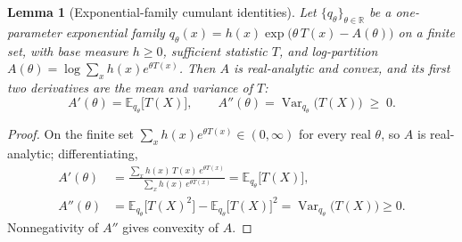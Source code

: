 \documentclass{article}
\newtheorem{lemma}{Lemma}
\DeclareMathOperator{\Var}{Var}
\newcommand{\E}{\mathbb{E}}
\newcommand{\R}{\mathbb{R}}
\begin{document}
\begin{lemma}[Exponential-family cumulant identities]
\label{lem:expfam}
Let $\{q_\theta\}_{\theta\in\R}$ be a one-parameter exponential family $q_\theta(x)=h(x)\exp\!\big(\theta\,T(x)-A(\theta)\big)$ on a finite set, with base measure $h\ge0$, sufficient statistic $T$, and log-partition $A(\theta)=\log\sum_x h(x)e^{\theta T(x)}$. Then $A$ is real-analytic and convex, and its first two derivatives are the mean and variance of $T$:
\begin{equation}
\label{eq:expfam-deriv}
A'(\theta)=\E_{q_\theta}\!\big[T(X)\big],
\qquad
A''(\theta)=\Var_{q_\theta}\!\big(T(X)\big)\;\ge\;0.
\end{equation}
\end{lemma}
\begin{proof}
On the finite set $\sum_x h(x)e^{\theta T(x)}\in(0,\infty)$ for every real $\theta$, so $A$ is real-analytic; differentiating,
\begin{align*}
A'(\theta)&=\frac{\sum_x h(x)\,T(x)\,e^{\theta T(x)}}{\sum_x h(x)\,e^{\theta T(x)}}=\E_{q_\theta}\big[T(X)\big],\\
A''(\theta)&=\E_{q_\theta}\big[T(X)^2\big]-\E_{q_\theta}\big[T(X)\big]^2=\Var_{q_\theta}\big(T(X)\big)\ge0.
\end{align*}
Nonnegativity of $A''$ gives convexity of $A$.
\end{proof}
\end{document}
